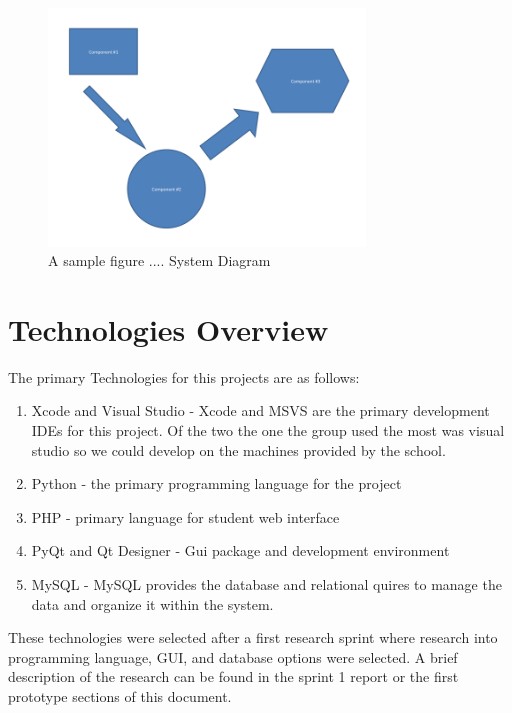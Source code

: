 \begin{figure}[tbh]
\begin{center}
\includegraphics[width=0.75\textwidth]{./diagram}
\end{center}
\caption{A sample figure .... System Diagram \label{systemdiagram}}
\end{figure}

\section{Technologies Overview}
The primary Technologies for this projects are as follows:

\begin{enumerate}
\item Xcode and Visual Studio - Xcode and MSVS are the primary development IDEs for this project. Of the two the one the group used the most was visual studio so we could develop on the machines provided by the school.
\item Python - the primary programming language for the project
\item PHP - primary language for student web interface
\item PyQt and Qt Designer - Gui package and development environment 
\item MySQL - MySQL provides the database and relational quires to manage the data and organize it within the system.
\end{enumerate}


These technologies were selected after a first research sprint where research into programming language, GUI, and database options were selected. A brief description                    of the research can be found in the sprint 1 report or the first prototype sections of this document.